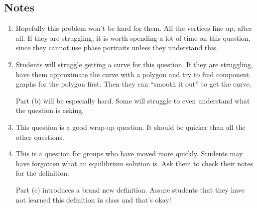 	
\subsection*{Notes}
	\begin{enumerate}
		\item Hopefully this problem won't be hard for them. All the vertices line up, after all. If they are struggling,
		it is worth spending a lot of time on this question, since they cannot use phase portraits unless they understand this.

		\item Students will struggle getting a curve for this question. If they are struggling, have them approximate
		the curve with a polygon and try to find component graphs for the polygon first. Then they can ``smooth it out''
		to get the curve.
		
		Part (b) will be especially hard. Some will struggle to even understand what the question is asking.

		\item This question is a good wrap-up question. It should be quicker than all the other questions.

		\item This is a question for groups who have moved more quickly. Students may have forgotten what an equilibrium
		solution is. Ask them to check their notes for the definition.

		Part (c) introduces a brand new definition. Assure students that they have not learned this definition in class
		and that's okay!

	\end{enumerate}